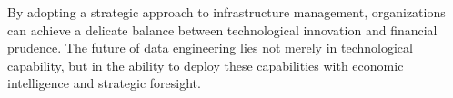 By adopting a strategic approach to infrastructure management, organizations can achieve a delicate
balance between technological innovation and financial prudence. The future of data engineering lies
not merely in technological capability, but in the ability to deploy these capabilities with
economic intelligence and strategic foresight.

